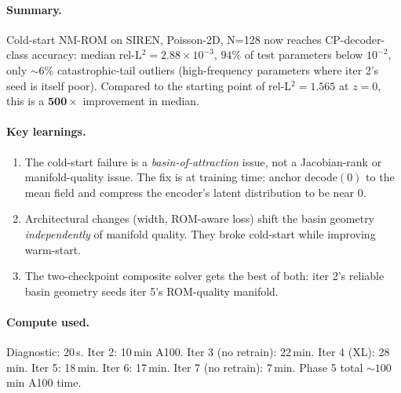 \documentclass[11pt]{article}
\begin{document}
\paragraph{Summary.} Cold-start NM-ROM on SIREN, Poisson-2D, N=128 now
reaches CP-decoder-class accuracy: median rel-L${}^2 = 2.88\times
10^{-3}$, $94\%$ of test parameters below $10^{-2}$, only $\sim 6\%$
catastrophic-tail outliers (high-frequency parameters where iter 2's
seed is itself poor). Compared to the starting point of rel-L${}^2 =
1.565$ at $z=0$, this is a $\boldsymbol{500\times}$ improvement in
median.

\paragraph{Key learnings.}
\begin{enumerate}
\item The cold-start failure is a \emph{basin-of-attraction} issue,
      not a Jacobian-rank or manifold-quality issue. The fix is at
      training time: anchor decode$(0)$ to the mean field and compress
      the encoder's latent distribution to be near 0.
\item Architectural changes (width, ROM-aware loss) shift the basin
      geometry \emph{independently} of manifold quality. They broke
      cold-start while improving warm-start.
\item The two-checkpoint composite solver gets the best of both:
      iter 2's reliable basin geometry seeds iter 5's
      ROM-quality manifold.
\end{enumerate}

\paragraph{Compute used.} Diagnostic: 20\,s. Iter 2: 10\,min A100.
Iter 3 (no retrain): 22\,min. Iter 4 (XL): 28\,min. Iter 5: 18\,min.
Iter 6: 17\,min. Iter 7 (no retrain): 7\,min. Phase 5 total
$\sim 100$\,min A100 time.
\end{document}
